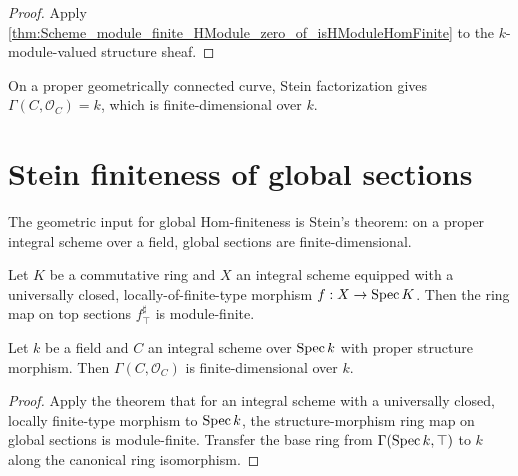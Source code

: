 \begin{proof}
  \leanok
  Apply \cref{thm:Scheme_module_finite_HModule_zero_of_isHModuleHomFinite} to the \(k\)-module-valued structure sheaf.
\end{proof}

\begin{remark}
  On a proper geometrically connected curve, Stein factorization gives \(\Gamma(C, \mathcal O_C) = k\), which is finite-dimensional over \(k\).
\end{remark}

\section{Stein finiteness of global sections}
\label{sec:module_finite_globalSections_iter044}

The geometric input for global Hom-finiteness is Stein's theorem: on a proper integral scheme over a field, global sections are finite-dimensional.

\begin{theorem}
  \label{thm:finite_appTop_of_universallyClosed}

  Let \(K\) be a commutative ring and \(X\) an integral scheme equipped with a
  universally closed, locally-of-finite-type morphism \(f : X \to \operatorname{Spec} K\).
  Then the ring map on top sections \(f^\sharp_{\top}\) is module-finite.

\end{theorem}

\begin{theorem}\leanok
  \label{thm:Scheme_module_finite_globalSections_of_isProper}

  Let \(k\) be a field and \(C\) an integral scheme over \(\operatorname{Spec} k\) with proper structure morphism. Then \(\Gamma(C, \mathcal O_C)\) is finite-dimensional over \(k\).
\end{theorem}

\begin{proof}
  
  \leanok
  Apply the theorem that for an integral scheme with a universally closed, locally finite-type morphism to \(\operatorname{Spec} k\), the structure-morphism ring map on global sections is module-finite. Transfer the base ring from \(\Gamma(\operatorname{Spec} k, \top)\) to \(k\) along the canonical ring isomorphism.
\end{proof}

